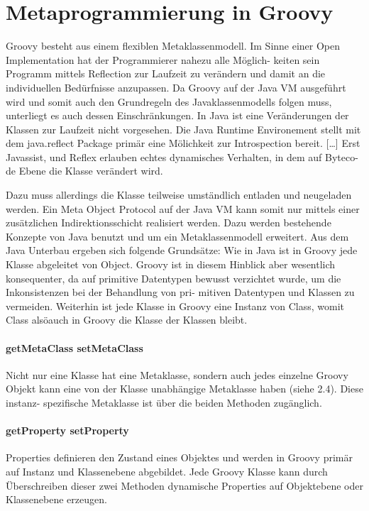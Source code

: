 \documentclass[11pt,english,ngerman, headsepline]{scrreprt}
\begin{document}
\section{Metaprogrammierung in Groovy}
Groovy besteht aus einem flexiblen Metaklassenmodell. Im Sinne einer Open
Implementation hat der Programmierer nahezu alle Möglich- keiten sein Programm
mittels Reflection zur Laufzeit zu verändern und damit an die individuellen
Bedürfnisse anzupassen. \cite{mpInGroovy} Da Groovy auf der Java VM ausgeführt
wird und somit auch den Grundregeln des Javaklassenmodells folgen muss,
unterliegt es auch dessen Einschränkungen. In Java ist eine Veränderungen der
Klassen zur Laufzeit nicht vorgesehen. Die Java Runtime Environement stellt mit
dem java.reflect Package primär eine Mölichkeit zur Introspection bereit.
[\ldots] 
Erst Javassist, und Reflex erlauben echtes dynamisches
Verhalten, in dem auf Byteco- de Ebene die Klasse verändert wird. 

Dazu muss allerdings die Klasse teilweise umständlich entladen und neugeladen
werden. 
Ein Meta Object Protocol auf der Java VM kann
somit nur mittels einer zusätzlichen Indirektionsschicht realisiert werden.
Dazu werden bestehende Konzepte von Java benutzt und um ein Metaklassenmodell
erweitert. Aus dem Java Unterbau ergeben sich folgende Grundsätze:
Wie in Java ist in Groovy jede Klasse abgeleitet von Object. Groovy ist in
diesem Hinblick aber wesentlich konsequenter, da auf primitive Datentypen
bewusst verzichtet wurde, um die Inkonsistenzen bei der Behandlung von pri-
mitiven Datentypen und Klassen zu vermeiden. Weiterhin ist jede Klasse in Groovy
eine Instanz von Class, womit Class alsöauch in Groovy die Klasse der Klassen
bleibt.  \cite{mpInGroovy}

\paragraph{ getMetaClass setMetaClass} Nicht nur eine Klasse hat eine
Metaklasse, sondern auch jedes einzelne Groovy Objekt kann eine von der Klasse
unabhängige Metaklasse haben (siehe 2.4). Diese instanz- spezifische Metaklasse
ist über die beiden Methoden zugänglich.\\

\paragraph{ getProperty setProperty} Properties definieren den Zustand eines
Objektes und werden in Groovy primär auf Instanz und Klassenebene abgebildet. Jede Groovy
Klasse kann durch Überschreiben dieser zwei Methoden dynamische Properties auf
Objektebene oder Klassenebene erzeugen. \\
\end{document}

